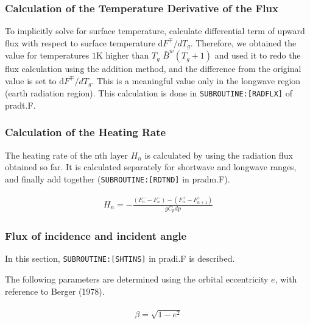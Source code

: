 \hypertarget{calculation-of-the-temperature-derivative-of-the-flux}{%
\subsubsection{Calculation of the Temperature Derivative of the Flux}\label{calculation-of-the-temperature-derivative-of-the-flux}}

To implicitly solve for surface temperature, calculate differential term of upward flux with respect to surface temperature \(\mathrm{d}F^{\mp}/dT_{g}\). Therefore, we obtained the value for
temperatures \(1\text{K}\) higher than \(T_g\) \(\bar{B}^{w}\left(T_{g}+1\right)\) and used it to redo the flux calculation using the addition method, and the difference from the original value is set
to \(\mathrm{d}F^{\mp}/dT_{g}\). This is a meaningful value only in the longwave region (earth radiation region). This calculation is done in \texttt{SUBROUTINE:{[}RADFLX{]}} of pradt.F.

\hypertarget{calculation-of-the-heating-rate}{%
\subsubsection{Calculation of the Heating Rate}\label{calculation-of-the-heating-rate}}

The heating rate of the nth layer \(H_n\) is calculated by using the radiation flux obtained so far. It is calculated separately for shortwave and longwave ranges, and finally add together
(\texttt{SUBROUTINE:{[}RDTND{]}} in pradm.F).

\begin{eqnarray}
H_{n}=-\frac{\left(F_{n}^{-}-F_{n}^{-}\right)-\left(F_{n}^{+}-F_{n+1}^{+}\right)}{g C_{p} d p}
\end{eqnarray}

\hypertarget{flux-of-incidence-and-incident-angle}{%
\subsubsection{Flux of incidence and incident angle}\label{flux-of-incidence-and-incident-angle}}

In this section, \texttt{SUBROUTINE:{[}SHTINS{]}} in pradi.F is described.

The following parameters are determined using the orbital eccentricity \(e\), with reference to Berger (1978).

\begin{eqnarray}
\begin{array}{l}
\beta=\sqrt{1-e^{2}}
\end{array}
\end{eqnarray}


